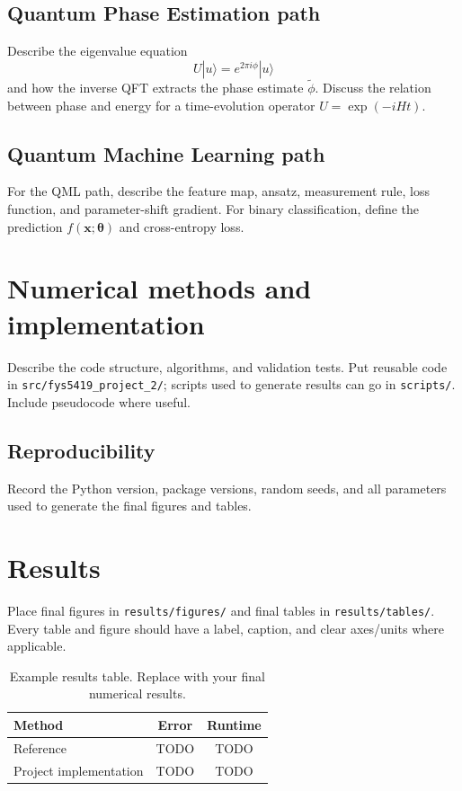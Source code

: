 \documentclass[11pt,a4paper]{article}
\begin{document}
\subsection{Quantum Phase Estimation path}
Describe the eigenvalue equation
\begin{equation}
    U|u\rangle = e^{2\pi i \phi}|u\rangle
\end{equation}
and how the inverse QFT extracts the phase estimate \(\tilde{\phi}\). Discuss the relation between phase and energy for a time-evolution operator \(U=\exp(-iHt)\).

\subsection{Quantum Machine Learning path}
For the QML path, describe the feature map, ansatz, measurement rule, loss function, and parameter-shift gradient. For binary classification, define the prediction \(f(\bm{x};\bm{\theta})\) and cross-entropy loss.

\section{Numerical methods and implementation}
Describe the code structure, algorithms, and validation tests. Put reusable code in \texttt{src/fys5419\_project\_2/}; scripts used to generate results can go in \texttt{scripts/}. Include pseudocode where useful.

\subsection{Reproducibility}
Record the Python version, package versions, random seeds, and all parameters used to generate the final figures and tables.

\section{Results}
Place final figures in \texttt{results/figures/} and final tables in \texttt{results/tables/}. Every table and figure should have a label, caption, and clear axes/units where applicable.

\begin{table}[h]
    \centering
    \caption{Example results table. Replace with your final numerical results.}
    \label{tab:example}
    \begin{tabular}{lcc}
        \toprule
        Method & Error & Runtime \\
        \midrule
        Reference & TODO & TODO \\
        Project implementation & TODO & TODO \\
        \bottomrule
    \end{tabular}
\end{table}
\end{document}
